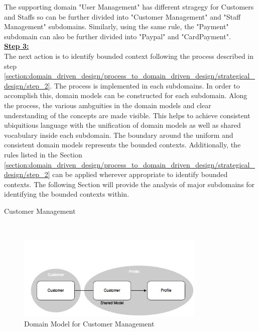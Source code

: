 The supporting domain "User Management" has different stragegy for Customers and Staffs so can be further divided into "Customer Management" and "Staff Management" subdomains. Similarly, using the same rule, the "Payment" subdomain can also be further divided into "Paypal" and "CardPayment".
\\
\textbf{\underline{Step 3:}}
\\
The next action is to identify bounded context following the process described in step \ref{section:domain_driven_design/process_to_domain_driven_design/strategical_design/step_2}. The process is implemented in each subdomains. In order to accomplish this, domain models can be constructed for each subdomain. Along the process, the various ambguities in the domain models and clear understanding of the concepts are made visible. This helps to achieve consistent ubiquitious language with the unification of domain models as well as shared vocabulary inside each subdomain. The boundary around the uniform and consistent domain models represents the bounded contexts. Additionally, the rules listed in the Section \ref{section:domain_driven_design/process_to_domain_driven_design/strategical_design/step_2} can be applied wherever appropriate to identify bounded contexts.
The following Section will provide the analysis of major subdomains for identifying the bounded contexts within.\\
\begin{shaded} Customer Management \end{shaded}
\\
\begin{figure}[H]
\begin{center}
\includegraphics[width=0.8\textwidth]{figures/domain-driven-design-two}
\caption{Domain Model for Customer Management}
\label{fig:domain_driven_design/example_scenario/subdomains/Customer}
\end{center}
\end{figure}
\\
